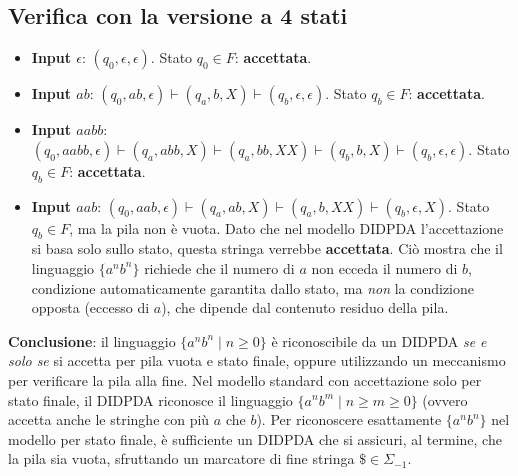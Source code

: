\documentclass[a4paper,12pt]{article}
\begin{document}
\subsection*{Verifica con la versione a 4 stati}

\begin{itemize}
    \item \textbf{Input $\epsilon$}: $(q_0, \epsilon, \epsilon)$. Stato $q_0 \in F$: \textbf{accettata}.
    \item \textbf{Input $ab$}:
    $(q_0, ab, \epsilon) \vdash (q_a, b, X) \vdash (q_b, \epsilon, \epsilon)$. Stato $q_b \in F$: \textbf{accettata}.
    \item \textbf{Input $aabb$}:
    $(q_0, aabb, \epsilon) \vdash (q_a, abb, X) \vdash (q_a, bb, XX) \vdash (q_b, b, X) \vdash (q_b, \epsilon, \epsilon)$. Stato $q_b \in F$: \textbf{accettata}.
    \item \textbf{Input $aab$}:
    $(q_0, aab, \epsilon) \vdash (q_a, ab, X) \vdash (q_a, b, XX) \vdash (q_b, \epsilon, X)$. Stato $q_b \in F$, ma la pila non è vuota. Dato che nel modello DIDPDA l'accettazione si basa solo sullo stato, questa stringa verrebbe \textbf{accettata}. Ciò mostra che il linguaggio $\{a^n b^n\}$ richiede che il numero di $a$ non ecceda il numero di $b$, condizione automaticamente garantita dallo stato, ma \emph{non} la condizione opposta (eccesso di $a$), che dipende dal contenuto residuo della pila.
\end{itemize}

\medskip

\textbf{Conclusione}: il linguaggio $\{a^n b^n \mid n \geq 0\}$ è riconoscibile da un DIDPDA \emph{se e solo se} si accetta per pila vuota e stato finale, oppure utilizzando un meccanismo per verificare la pila alla fine. Nel modello standard con accettazione solo per stato finale, il DIDPDA riconosce il linguaggio $\{a^n b^m \mid n \geq m \geq 0\}$ (ovvero accetta anche le stringhe con più $a$ che $b$). Per riconoscere esattamente $\{a^n b^n\}$ nel modello per stato finale, è sufficiente un DIDPDA che si assicuri, al termine, che la pila sia vuota, sfruttando un marcatore di fine stringa $\$ \in \Sigma_{-1}$.
\end{document}
